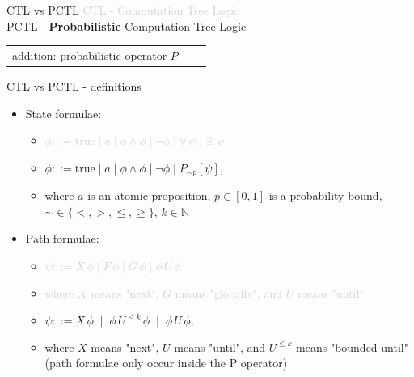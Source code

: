 \documentclass[dvipsnames]{beamer}
\begin{document}
\begin{frame}{CTL vs PCTL}
    \textcolor{lightgray}{CTL - Computation Tree Logic }\\
    PCTL - \textbf{Probabilistic} Computation Tree Logic\\
    \begin{tabular}{lp{30mm}p{30mm}}
        addition: probabilistic operator $P$
    \end{tabular}
\end{frame}
\begin{frame}{CTL vs PCTL - definitions}
    \begin{itemize}
        \item State formulae:
              \begin{itemize}
                  \item[] \textcolor{lightgray}{$\phi ::= \text{true} \mid a \mid \phi \land \phi \mid \neg \phi \mid \forall\,\psi \mid \exists,\psi$}
                  \item[]
                        $\phi ::= \text{true} \mid a \mid \phi \land \phi \mid \neg \phi \mid P_{\sim p}[\psi]$,
                  \item[] where $a$ is an atomic proposition,
                        $p \in [0,1]$ is a probability bound,
                        $\sim \in \{<,>,\leq,\geq\}$,
                        $k \in \mathbb{N}$
              \end{itemize}

        \item Path formulae:
              \begin{itemize}
                  \item[] \textcolor{lightgray}{$\psi ::= X\,\phi \mid F\,\phi \mid G\,\phi \mid \phi \, U \, \phi$}
                  \item[] \textcolor{lightgray}{where $X$ means "next", $G$ means "globally", and $U$ means "until"}
                  \item[]
                        $\psi ::= X\,\phi
                            \;\mid\;
                            \phi\, U^{\leq k}\, \phi
                            \;\mid\;
                            \phi\, U\, \phi$,\\

                  \item[] where $X$ means "next", $U$ means "until", and $U^{\leq k}$ means "bounded until"\\
                        \hfill {(path formulae only occur inside the P operator)}

              \end{itemize}
    \end{itemize}
\end{frame}
\end{document}

